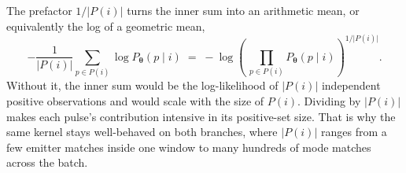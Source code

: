 The prefactor $1/\lvert P(i)\rvert$ turns the inner sum into an arithmetic mean, or equivalently the log of a geometric mean,
\begin{equation}\label{eq:method:supcon_geomean}
  -\frac{1}{\lvert P(i)\rvert} \sum_{p \in P(i)} \log P_{\bm{\theta}}(p \mid i)
  \;=\;
  -\log\!\left(\,\prod_{p \in P(i)} P_{\bm{\theta}}(p \mid i)\right)^{\!1/\lvert P(i)\rvert}.
\end{equation}
Without it, the inner sum would be the log-likelihood of $\lvert P(i)\rvert$ independent positive observations and would scale with the size of $P(i)$.
Dividing by $\lvert P(i)\rvert$ makes each pulse's contribution intensive in its positive-set size.
That is why the same kernel stays well-behaved on both branches, where $\lvert P(i)\rvert$ ranges from a few emitter matches inside one window to many hundreds of mode matches across the batch.
